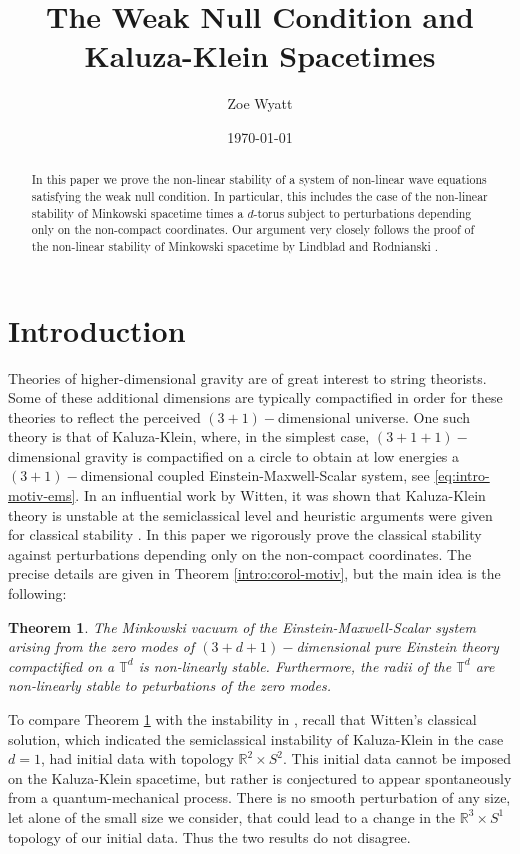 \documentclass[11pt, a4paper]{amsart}
\title{The Weak Null Condition and Kaluza-Klein Spacetimes}
\author{Zoe Wyatt}
\date{\today}
\numberwithin{equation}{section}
\newtheorem{theorem}{Theorem}
\numberwithin{theorem}{section}
\newcommand{\R}{\mathbb{R}}
\newcommand{\tee}{{\mathbb{T}^d}}
\begin{document}
\begin{abstract}
In this paper we prove the non-linear stability of a system of non-linear wave equations satisfying the weak null condition. In particular, this includes the case of the non-linear stability of Minkowski spacetime times a $d$-torus subject to perturbations depending only on the non-compact coordinates. Our argument very closely follows the proof of the non-linear stability of Minkowski spacetime by Lindblad and Rodnianski \cite{LR:04}. 
\end{abstract}
\maketitle

\section{Introduction}
Theories of higher-dimensional gravity are of great interest to string theorists. Some of these additional dimensions are typically compactified in order for these theories to reflect the perceived $(3+1)-$dimensional universe. One such theory is that of Kaluza-Klein, where, in the simplest case, $(3+1+1)-$dimensional gravity is compactified on a circle to obtain at low energies a $(3+1)-$dimensional coupled Einstein-Maxwell-Scalar system, see \eqref{eq:intro-motiv-ems}. In an influential work by Witten, it was shown that Kaluza-Klein theory is unstable at the semiclassical level and heuristic arguments were given for classical stability \cite{Witten:1981gj}. In this paper we rigorously prove the classical stability against perturbations depending only on the non-compact coordinates. The precise details are given in Theorem \ref{intro:corol-motiv}, but the main idea is the following:
\begin{theorem} \label{intro:motiv-theorem}
The Minkowski vacuum of the Einstein-Maxwell-Scalar system arising from the zero modes of $(3+d+1)-$dimensional pure Einstein theory compactified on a $\tee$ is non-linearly stable. Furthermore, the radii of the $\tee$ are non-linearly stable to peturbations of the zero modes. 
\end{theorem}
To compare Theorem \ref{intro:motiv-theorem} with the instability in \cite{Witten:1981gj}, recall that  Witten's classical solution, which indicated the semiclassical instability of Kaluza-Klein in the case $d=1$, had initial data with topology $\R^2 \times S^2$. This initial data cannot be imposed on the Kaluza-Klein spacetime, but rather is conjectured to appear spontaneously from a quantum-mechanical process. There is no smooth perturbation of any size, let alone of the small size we consider, that could lead to a change in the $\R^3 \times S^1$ topology of our initial data. Thus the two results do not disagree. 
\end{document}
